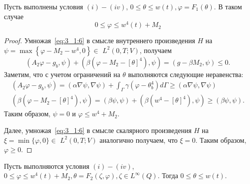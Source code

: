 \begin{lemma}
    \label{lm:3_1:1}
    Пусть выполнены условия $(i) - (iv)$, $0 \leq \theta \leq w(t), \varphi=F_{1}(\theta)$.
    В таком случае
    \begin{equation}
        \label{eq:3_1:8}
        0 \leq \varphi \leq w^{4}(t)+M_{2}
    \end{equation}
\end{lemma}
\begin{proof}
    Умножая~\eqref{eq:3_1:6} в смысле внутреннего произведения $H$ на
    $\psi=\max \left\{\varphi-M_{2}-w^{4}, 0\right\} \in$ $L^{2}(0, T ; V)$, получаем
    \[
        \left(A_{2} \varphi-g_{b}, \psi\right)+\left(\beta\left(\varphi-M_{2}-[\theta]^{4}\right),
        \psi\right)=\left(g-\beta M_{2}, \psi\right) \leq 0.
    \]
    Заметим, что с учетом ограничений на $\theta$ выполняются следующие неравенства:
    \[
        \begin{gathered}
            \left(A_{2} \varphi-g_{b}, \psi\right)=(\alpha \nabla \psi, \nabla \psi)+
            \int_{\Gamma} \gamma\left(\varphi-\theta_{b}^{4}\right) d \Gamma
            \geq (\alpha \nabla \psi, \nabla \psi) \\
            \left(\beta\left(\varphi-M_{2}-[\theta]^{4}\right), \psi\right)=
            (\beta \psi, \psi)+\left(\beta\left(w^{4}-[\theta]^{4}\right), \psi\right)
            \geq(\beta \psi, \psi).
        \end{gathered}
    \]
    Таким образом, $\psi=0$ и $\varphi \leq w^{4}+M_{2}$.

    Далее, умножая~\eqref{eq:3_1:6} в смысле скалярного произведения $H$
    на $\xi=\min \{\varphi, 0\} \in$ $L^{2}(0, T ; V) $ аналогично получаем,
    что $\xi=0$.
    Таким образом, $\varphi\geq 0$.
\end{proof}

\begin{lemma}
    \label{lm:3_1:2}
    Пусть выполняются условия $(i)-(iv)$, $0 \leq \varphi \leq w^{4}(t)+M_{2},
    \theta=F_{2}(\zeta, \varphi), \zeta \in L^{\infty}(Q)$.
    Тогда $0 \leq \theta \leq w(t)$.
\end{lemma}

